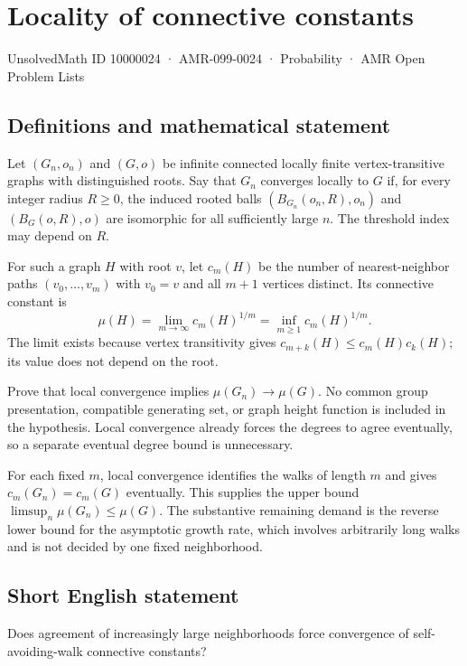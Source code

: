\documentclass[11pt,a4paper]{article}
\begin{document}
\section*{Locality of connective constants}\label{10000024}
{\small UnsolvedMath ID 10000024 · AMR-099-0024 · Probability · AMR Open Problem Lists}
\subsection{Definitions and mathematical statement}
Let $(G_n,o_n)$ and $(G,o)$ be infinite connected locally finite vertex-transitive graphs with distinguished roots. Say that $G_n$ converges locally to $G$ if, for every integer radius $R\ge0$, the induced rooted balls $(B_{G_n}(o_n,R),o_n)$ and $(B_G(o,R),o)$ are isomorphic for all sufficiently large $n$. The threshold index may depend on $R$.

For such a graph $H$ with root $v$, let $c_m(H)$ be the number of nearest-neighbor paths $(v_0,\ldots,v_m)$ with $v_0=v$ and all $m+1$ vertices distinct. Its connective constant is
\[
\mu(H)=\lim_{m\to\infty}c_m(H)^{1/m}
       =\inf_{m\ge1}c_m(H)^{1/m}.
\]
The limit exists because vertex transitivity gives $c_{m+k}(H)\le c_m(H)c_k(H)$; its value does not depend on the root.

Prove that local convergence implies $\mu(G_n)\to\mu(G)$. No common group presentation, compatible generating set, or graph height function is included in the hypothesis. Local convergence already forces the degrees to agree eventually, so a separate eventual degree bound is unnecessary.

For each fixed $m$, local convergence identifies the walks of length $m$ and gives $c_m(G_n)=c_m(G)$ eventually. This supplies the upper bound $\limsup_n\mu(G_n)\le\mu(G)$. The substantive remaining demand is the reverse lower bound for the asymptotic growth rate, which involves arbitrarily long walks and is not decided by one fixed neighborhood.
\subsection{Short English statement}
Does agreement of increasingly large neighborhoods force convergence of self-avoiding-walk connective constants?
\end{document}
